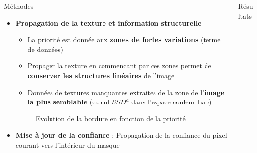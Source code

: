 \documentclass[final,hyperref={pdfpagelabels=false}]{beamer}
\begin{document}
\begin{frame}[t]
\begin{columns}[t]
\begin{column}{.465\textwidth}
\begin{block}{\Large Méthodes}
\begin{itemize}
\item \textbf{Propagation de la texture et information structurelle}
\begin{itemize}
\item La priorité est donnée aux \textbf{zones de fortes variations} (terme de données)
\item Propager la texture en commencant par ces zones permet de \textbf{conserver les structures linéaires} de l'image
\item Données de textures manquantes extraites de la zone de l'\textbf{image la plus semblable} (calcul $SSD^a$ dans l'espace couleur Lab)
\end{itemize}

\begin{figure}[H]
\centering
{}
\caption{Evolution de la bordure en fonction de la priorité}
\end{figure}
 
\item \textbf{Mise à jour de la confiance} : Propagation de la confiance du pixel courant vers l'intérieur du masque
\end{itemize}

\end{block}

\end{column}


\begin{column}{.465\textwidth}


\begin{block}{\Large Résultats}


\end{block}
\end{column}
\end{columns}
\end{frame}
\end{document}
